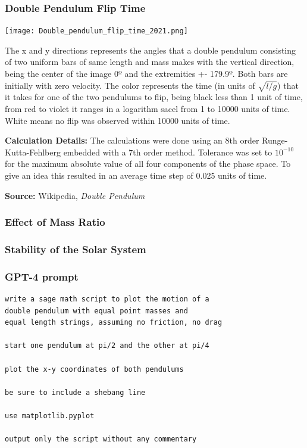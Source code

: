 \documentclass{beamer}
\begin{document}
\begin{frame}
\frametitle{Double Pendulum Flip Time}
\begin{center}
\vskip -0.1in
\texttt{[image: Double\_pendulum\_flip\_time\_2021.png]}
\end{center}

\tiny
The x and y directions represents the angles that a double pendulum consisting of two uniform bars of same length and mass makes with the vertical direction, being the center of the image 0º and the extremities +- 179.9º. Both bars are initially with zero velocity. The color represents the time (in units of $\sqrt {l/g}$) that it takes for one of the two pendulums to flip, being black less than 1 unit of time, from red to violet it ranges in a logarithm sacel from 1 to 10000 units of time. White means no flip was observed within 10000 units of time.

{\bf Calculation Details:}
The calculations were done using an 8th order Runge-Kutta-Fehlberg embedded with a 7th order method. Tolerance was set to $10^{-10}$ for the maximum absolute value of all four components of the phase space. To give an idea this resulted in an average time step of 0.025 units of time.

{\bf Source:} Wikipedia, {\it Double Pendulum}

\end{frame}

\begin{frame}
\frametitle{Effect of Mass Ratio}
\end{frame}

\begin{frame}
\frametitle{Stability of the Solar System}
\end{frame}

\begin{frame}[fragile]
\frametitle{GPT-4 prompt}
\begin{verbatim}
write a sage math script to plot the motion of a
double pendulum with equal point masses and
equal length strings, assuming no friction, no drag

start one pendulum at pi/2 and the other at pi/4

plot the x-y coordinates of both pendulums

be sure to include a shebang line

use matplotlib.pyplot

output only the script without any commentary

\end{verbatim}
\end{frame}
\end{document}
